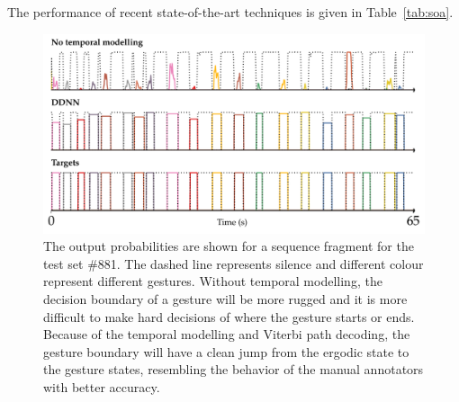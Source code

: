 The performance of recent state-of-the-art techniques is given in Table~\ref{tab:soa}.


\begin{figure}[t]
  \centering
  \includegraphics[width=.7\textwidth]{images/output.pdf}
  \caption{The output probabilities are shown for a sequence fragment for the test set \#881. The dashed line represents silence and different colour represent different gestures. Without temporal modelling, the decision boundary of a gesture will be more rugged and it is more difficult to make hard decisions of where the gesture starts or ends. Because of the temporal modelling and Viterbi path decoding, the gesture boundary will have a clean jump from the ergodic state to the gesture states, resembling the behavior of the manual annotators with better accuracy.}
    \label{fig:temporalModellingComparision}
\end{figure}


